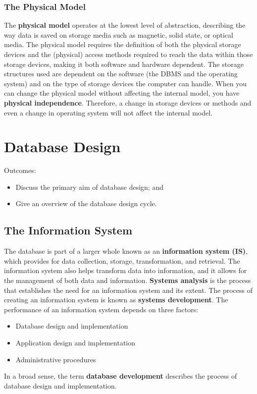 \documentclass[a4paper, 12pt, titlepage]{report}
\begin{document}
\subsection{The Physical Model}
The \textbf{physical model} operates at the lowest level of abstraction, describing the way data is saved on storage media such as magnetic, solid state, or optical media. The physical model requires the definition of both the physical storage devices and the (physical) access methods required to reach the data within those storage devices, making it both software and hardware dependent. The storage structures used are dependent on the software (the DBMS and the operating system) and on the type of storage devices the computer can handle. When you can change the physical model without affecting the internal model, you have \textbf{physical independence}. Therefore, a change in storage devices or methods and even a change in operating system will not affect the internal model.

\chapter{Database Design}
Outcomes:
\begin{itemize}
\item Discuss the primary aim of database design; and
\item Give an overview of the database design cycle.
\end{itemize}
\section{The Information System}
The database is part of a larger whole known as an \textbf{information system (IS)}, which provides for data collection, storage, transformation, and retrieval. The information system also helps transform data into information, and it allows for the management of both data and information. \textbf{Systems analysis} is the process that establishes the need for an information system and its extent. The process of creating an information system is known as \textbf{systems development}. The performance of an information system depends on three factors:
\begin{itemize}
\item Database design and implementation
\item Application design and implementation
\item Administrative procedures
\end{itemize}
In a broad sense, the term \textbf{database development} describes the process of database design and implementation.
\end{document}
